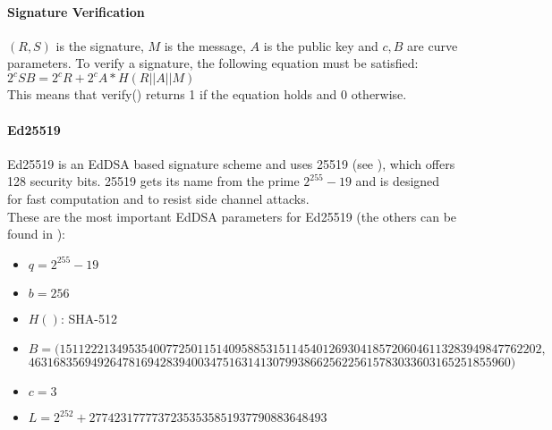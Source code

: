 \paragraph{Signature Verification}
$ (R, S) $ is the signature, $ M $ is the message, $ A $ is the public key and $c, B $ are curve parameters.
To verify a signature, the following equation must be satisfied:
\\$ 2^cSB = 2^cR + 2^cA*H(R || A || M) $
\\This means that verify() returns 1 if the equation holds and 0 otherwise.

\paragraph{Ed25519}
\label{par:curve25519}
Ed25519 is an \ac{EdDSA} based signature scheme and uses \gls{25519} (see \cite{bern:curve25519}), which offers 128 security bits.
\gls{25519} gets its name from the prime $ 2^{255} - 19 $ and is designed for fast computation and to resist side channel attacks.
\\These are the most important \ac{EdDSA} parameters for Ed25519 (the others can be found in \cite{rfc8032}):
\begin{itemize}
    \item $ q = 2^{255} - 19 $
    \item $ b = 256 $
    \item $ H() $: SHA-512
    \item $ B = (15112221349535400772501151409588531511454012693041857206046113283949847762202, $
          \\ $46316835694926478169428394003475163141307993866256225615783033603165251855960) $
    \item $ c = 3 $
    \item $ L = 2^{252} + 27742317777372353535851937790883648493 $
\end{itemize}
